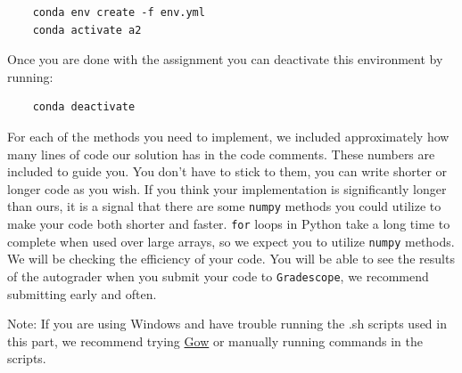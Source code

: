 \documentclass{article}
\begin{document}
\begin{verbatim}
    conda env create -f env.yml
    conda activate a2
\end{verbatim}

Once you are done with the assignment you can deactivate this environment by running:
\begin{verbatim}
    conda deactivate
\end{verbatim}

For each of the methods you need to implement, we included approximately how many lines of code our solution has in the code comments. These numbers are included to guide you. You don't have to stick to them, you can write shorter or longer code as you wish. If you think your implementation is significantly longer than ours, it is a signal that there are some \texttt{numpy} methods you could utilize to make your code both shorter and faster. \texttt{for} loops in Python take a long time to complete when used over large arrays, so we expect you to utilize \texttt{numpy} methods. We will be checking the efficiency of your code. You will be able to see the results of the autograder when you submit your code to \texttt{Gradescope}, we recommend submitting early and often.

Note: If you are using Windows and have trouble running the .sh scripts used in this part, we recommend trying \href{https://github.com/bmatzelle/gow}{Gow} or manually running commands in the scripts.
\end{document}
